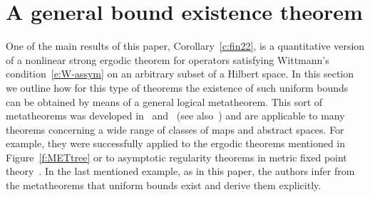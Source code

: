 \section{A general bound existence theorem}\label{s:meta}

One of the main results of this paper, Corollary~\ref{c:fin22}, is a quantitative version
of a nonlinear strong ergodic theorem for 
operators satisfying Wittmann's condition~\eqref{e:W-assym} 
on an arbitrary subset of a Hilbert space. In this section
we outline how for this type of theorems the existence of such uniform bounds 
can be obtained by means of a general logical metatheorem. This sort of 
metatheorems was developed in~\cite{Kohlenbach05meta} and~\cite{GK08} (see also~\cite{Kohlenbach08})
and are applicable to many theorems concerning a wide range of classes of maps and abstract spaces. 
For example, they were successfully applied to 
the ergodic theorems mentioned in Figure~\ref{f:METtree} or to 
asymptotic regularity theorems in metric fixed point theory~\cite{kohlenbachleustean10}.
In the last mentioned example, as in this paper, 
the authors infer from the metatheorems that uniform bounds exist and derive them explicitly.\\
